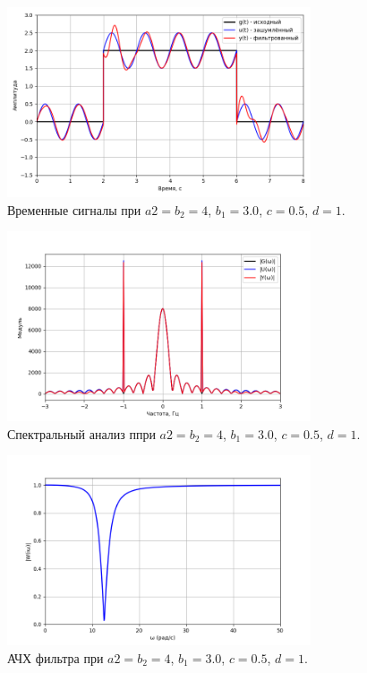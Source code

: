 \documentclass[a4paper]{article}
\begin{document}
\begin{figure}[H]
  \centering
  \includegraphics[width=0.8\textwidth]{src/task_1_2/4. time_157_3_0.5.png}
  \caption{Временные сигналы при $a2 = b_2 = 4$, $b_1=3.0$, $c=0.5$, $d=1$.}
\end{figure}
\begin{figure}[H]
  \centering
  \includegraphics[width=0.8\textwidth]{src/task_1_2/4. spec_157_3_0.5.png}
  \caption{Спектральный анализ ппри $a2 = b_2 = 4$, $b_1=3.0$, $c=0.5$, $d=1$.}
\end{figure}
\begin{figure}[H]
  \centering
  \includegraphics[width=0.8\textwidth]{src/task_1_2/4. ach_157_3_0.5.png}
  \caption{АЧХ фильтра при $a2 = b_2 = 4$, $b_1=3.0$, $c=0.5$, $d=1$.}
\end{figure}
\end{document}
